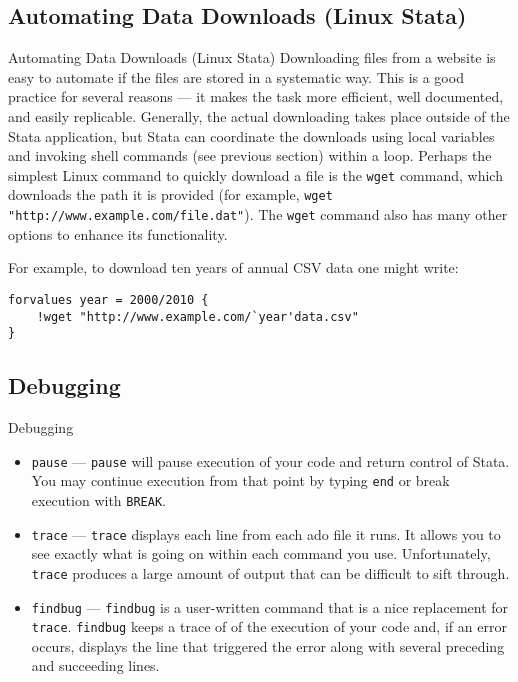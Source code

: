 \documentclass[fleqn, handout, 10pt]{beamer}
\def\lst{\lstinline}
\begin{document}
\subsection{Automating Data Downloads (Linux Stata)}

\begin{frame}[fragile]{Automating Data Downloads (Linux Stata)}
    Downloading files from a website is easy to automate if the files are stored in a systematic way. This is a good practice for several reasons — it makes the task more efficient, well documented, and easily replicable. Generally, the actual downloading takes place outside of the Stata application, but Stata can coordinate the downloads using local variables and invoking shell commands (see previous section) within a loop. Perhaps the simplest Linux command to quickly download a file is the \lst=wget= command, which downloads the path it is provided (for example, \lst+wget "http://www.example.com/file.dat"+). The \lst=wget= command also has many other options to enhance its functionality.

    For example, to download ten years of annual CSV data one might write:
    \begin{lstlisting}
forvalues year = 2000/2010 {
    !wget "http://www.example.com/`year'data.csv"
}
    \end{lstlisting}
\end{frame}

\subsection{Debugging}
\begin{frame}[fragile]{Debugging}
   \begin{itemize}
      \item \lst=pause= --- \lst=pause= will pause execution of your code and return control of Stata. You may continue execution from that point by typing \lst=end= or break execution with \lst=BREAK=.
      \item \lst=trace= --- \lst=trace= displays each line from each ado file it runs. It allows you to see exactly what is going on within each command you use. Unfortunately, \lst=trace= produces a large amount of output that can be difficult to sift through.
      \item \lst=findbug= --- \lst=findbug= is a user-written command that is a nice replacement for \lst=trace=. \lst=findbug= keeps a trace of of the execution of your code and, if an error occurs, displays the line that triggered the error along with several preceding and succeeding lines.
    \end{itemize}	
\end{frame}
\end{document}

